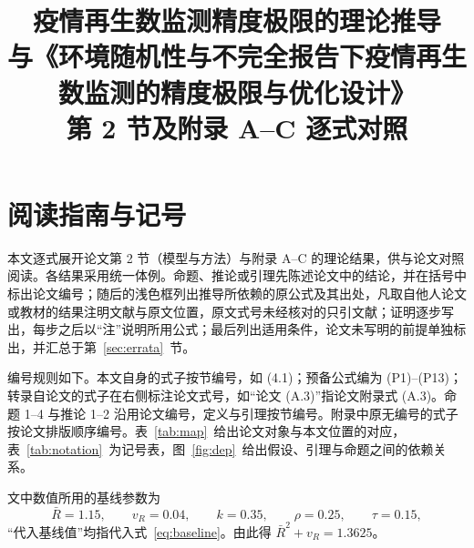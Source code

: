 \documentclass[fontset=none,11pt,a4paper,fleqn]{ctexart}
\title{疫情再生数监测精度极限的理论推导\\[0.4ex]
  {\large 与《环境随机性与不完全报告下疫情再生数监测的精度极限与优化设计》\\
  第 2 节及附录 A--C 逐式对照}}
\author{}
\date{}
\numberwithin{equation}{section}
\theoremstyle{zhthm}
\theoremstyle{zhrem}
\newcommand{\Rbar}{\bar R}
\begin{document}
\maketitle
\thispagestyle{plain}
\vspace{-6ex}

\section{阅读指南与记号}\label{sec:guide}

本文逐式展开论文第 2 节（模型与方法）与附录 A--C 的理论结果，供与论文对照阅读。各结果采用统一体例。命题、推论或引理先陈述论文中的结论，并在括号中标出论文编号；随后的浅色框列出推导所依赖的原公式及其出处，凡取自他人论文或教材的结果注明文献与原文位置，原文式号未经核对的只引文献；证明逐步写出，每步之后以“注”说明所用公式；最后列出适用条件，论文未写明的前提单独标出，并汇总于第~\ref{sec:errata}~节。

编号规则如下。本文自身的式子按节编号，如 (4.1)；预备公式编为 (P1)--(P13)；转录自论文的式子在右侧标注论文式号，如“论文 (A.3)”指论文附录式 (A.3)。命题 1--4 与推论 1--2 沿用论文编号，定义与引理按节编号。附录中原无编号的式子按论文排版顺序编号。表~\ref{tab:map}~给出论文对象与本文位置的对应，表~\ref{tab:notation}~为记号表，图~\ref{fig:dep}~给出假设、引理与命题之间的依赖关系。

文中数值所用的基线参数为
\begin{equation}\label{eq:baseline}
\Rbar=1.15,\qquad v_R=0.04,\qquad k=0.35,\qquad \rho=0.25,\qquad \tau=0.15,
\end{equation}
“代入基线值”均指代入式~\eqref{eq:baseline}。由此得 $\Rbar^2+v_R=1.3625$。
\end{document}
